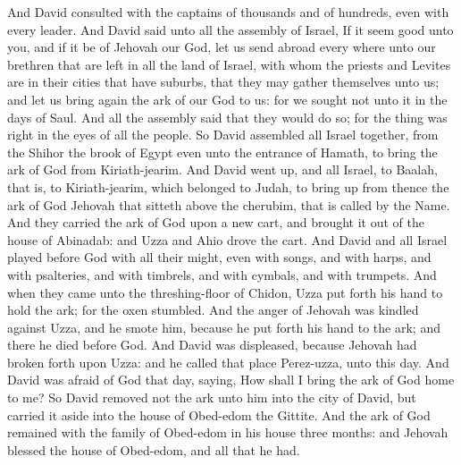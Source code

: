 And David consulted with the captains of thousands and of hundreds, even with every leader. And David said unto all the assembly of Israel, If it seem good unto you, and if it be of Jehovah our God, let us send abroad every where unto our brethren that are left in all the land of Israel, with whom the priests and Levites are in their cities that have suburbs, that they may gather themselves unto us; and let us bring again the ark of our God to us: for we sought not unto it in the days of Saul. And all the assembly said that they would do so; for the thing was right in the eyes of all the people. So David assembled all Israel together, from the Shihor the brook of Egypt even unto the entrance of Hamath, to bring the ark of God from Kiriath-jearim. And David went up, and all Israel, to Baalah, that is, to Kiriath-jearim, which belonged to Judah, to bring up from thence the ark of God Jehovah that sitteth above the cherubim, that is called by the Name. And they carried the ark of God upon a new cart, and brought it out of the house of Abinadab: and Uzza and Ahio drove the cart. And David and all Israel played before God with all their might, even with songs, and with harps, and with psalteries, and with timbrels, and with cymbals, and with trumpets.  And when they came unto the threshing-floor of Chidon, Uzza put forth his hand to hold the ark; for the oxen stumbled. And the anger of Jehovah was kindled against Uzza, and he smote him, because he put forth his hand to the ark; and there he died before God. And David was displeased, because Jehovah had broken forth upon Uzza: and he called that place Perez-uzza, unto this day. And David was afraid of God that day, saying, How shall I bring the ark of God home to me? So David removed not the ark unto him into the city of David, but carried it aside into the house of Obed-edom the Gittite. And the ark of God remained with the family of Obed-edom in his house three months: and Jehovah blessed the house of Obed-edom, and all that he had. 

